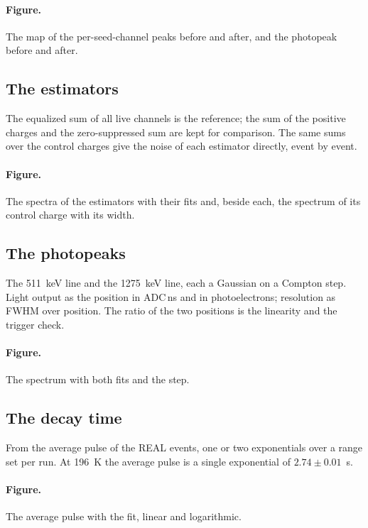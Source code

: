 \documentclass[11pt]{article}
\newcommand{\us}{\textmu s\xspace}
\begin{document}
\paragraph{Figure.} The map of the per-seed-channel peaks before and
after, and the photopeak before and after.

\subsection{The estimators}

The equalized sum of all live channels is the reference; the sum of the
positive charges and the zero-suppressed sum are kept for comparison.
The same sums over the control charges give the noise of each estimator
directly, event by event.

\paragraph{Figure.} The spectra of the estimators with their fits and,
beside each, the spectrum of its control charge with its width.

\subsection{The photopeaks}

The 511~keV line and the 1275~keV line, each a Gaussian on a Compton
step. Light output as the position in ADC\,ns and in photoelectrons;
resolution as FWHM over position. The ratio of the two positions is the
linearity and the trigger check.

\paragraph{Figure.} The spectrum with both fits and the step.

\subsection{The decay time}
\label{sec:decay}

From the average pulse of the REAL events, one or two exponentials over
a range set per run. At 196~K the average pulse is a single exponential
of $2.74 \pm 0.01$~\us.

\paragraph{Figure.} The average pulse with the fit, linear and
logarithmic.
\end{document}
